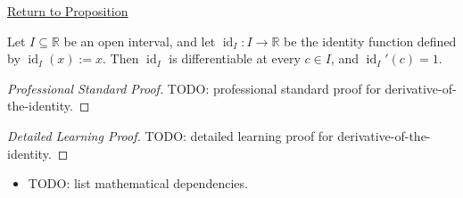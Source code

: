 \newpage
{}
\label{prf:derivative-of-the-identity}

\begin{remark*}[Return]
\hyperref[prop:derivative-of-the-identity]{Return to Proposition}
\end{remark*}

\begin{proposition*}
Let $I \subseteq \mathbb{R}$ be an open interval, and let $\operatorname{id}_I : I \to \mathbb{R}$ be the identity function defined by $\operatorname{id}_I(x) := x$. Then $\operatorname{id}_I$ is differentiable at every $c \in I$, and $\operatorname{id}_I'(c) = 1$.
\end{proposition*}

\begin{proof}[Professional Standard Proof]
\LRAProofBodyStart
TODO: professional standard proof for derivative-of-the-identity.
\end{proof}

\begin{proof}[Detailed Learning Proof]
\LRAProofBodyStart
TODO: detailed learning proof for derivative-of-the-identity.
\end{proof}

\begin{remark*}
\end{remark*}

\begin{dependencies}
\begin{itemize}
  \item TODO: list mathematical dependencies.
\end{itemize}
\end{dependencies}

\clearpage
